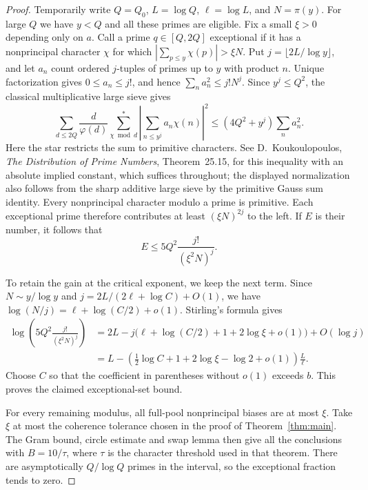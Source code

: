 \documentclass[11pt]{article}
\begin{document}
\begin{proof}
Temporarily write $Q=Q_0$, $L=\log Q$, $\ell=\log L$, and $N=\pi(y)$.
For large $Q$ we have $y<Q$ and all these primes are eligible.
Fix a small $\xi>0$ depending only on $a$.
Call a prime $q\in[Q,2Q]$ exceptional if it has a nonprincipal character
$\chi$ for which $|\sum_{p\le y}\chi(p)|>\xi N$.
Put $j=\lfloor 2L/\log y\rfloor$, and let $a_n$ count ordered
$j$-tuples of primes up to $y$ with product $n$.
Unique factorization gives $0\le a_n\le j!$, and hence
$\sum_n a_n^2\le j!N^j$. Since $y^j\le Q^2$, the classical
multiplicative large sieve gives
\[
 \sum_{d\le2Q}\frac{d}{\varphi(d)}
 \sum_{\chi\bmod d}^{*}\left|\sum_{n\le y^j}a_n\chi(n)\right|^2
 \le (4Q^2+y^j)\sum_n a_n^2 .
\]
Here the star restricts the sum to primitive characters.  See
D.~Koukoulopoulos, \emph{The Distribution of Prime Numbers},
Theorem~25.15, for this inequality with an absolute implied constant,
which suffices throughout; the displayed normalization also follows from
the sharp additive large sieve by the primitive Gauss sum identity.
Every nonprincipal character modulo a prime is primitive.
Each exceptional prime therefore contributes at least $(\xi N)^{2j}$
to the left. If $E$ is their number, it follows that
\[
 E\le 5Q^2\frac{j!}{(\xi^2N)^j}.
\]

To retain the gain at the critical exponent, we keep the next term.
Since $N\sim y/\log y$ and $j=2L/(2\ell+\log C)+O(1)$, we have
$\log(N/j)=\ell+\log(C/2)+o(1)$.  Stirling's formula gives
\begin{align*}
 \log\!\left(5Q^2\frac{j!}{(\xi^2N)^j}\right)
 &= 2L-j\bigl(\ell+\log(C/2)+1+2\log\xi+o(1)\bigr)
      + O(\log j)\\
 &=L-\left(\tfrac12\log C+1+2\log\xi-\log 2+o(1)\right)
           \frac{L}{\ell}.
\end{align*}
Choose $C$ so that the coefficient in parentheses without $o(1)$
exceeds $b$. This proves the claimed exceptional-set bound.

For every remaining modulus, all full-pool nonprincipal biases are at most
$\xi$. Take $\xi$ at most the coherence tolerance chosen in the proof of
Theorem~\ref{thm:main}. The Gram bound, circle estimate and swap lemma
then give all the conclusions with $B=10/\tau$, where $\tau$ is the
character threshold used in that theorem. There are asymptotically
$Q/\log Q$ primes in the interval, so the exceptional fraction tends to zero.
\end{proof}
\end{document}
